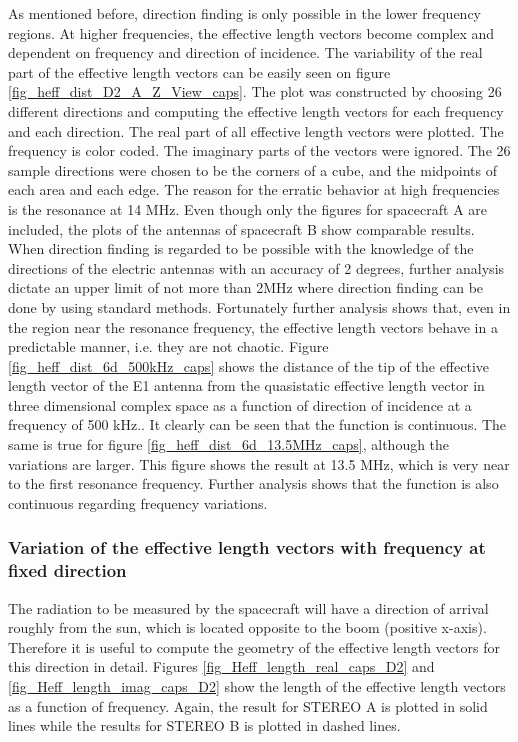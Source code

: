 \documentclass[galley,ras]{agu2001}
\begin{document}
\begin{article}
As mentioned before, direction finding is only possible in the lower frequency regions. At higher frequencies, the effective length vectors become complex and dependent on frequency and direction of incidence. The variability of the real part of the effective length vectors can be easily seen on figure \ref{fig_heff_dist_D2_A_Z_View_caps}. The plot was constructed by choosing 26 different directions and computing the effective length vectors for each frequency and each direction. The real part of all effective length vectors were plotted. The frequency is color coded. The imaginary parts of the vectors were ignored. The 26 sample directions were chosen to be the corners of a cube, and the midpoints of each area and each edge. The reason for the erratic behavior at high frequencies is the resonance at 14 MHz. Even though only the figures for spacecraft A are included, the plots of the antennas of spacecraft B show comparable results.\\


When direction finding is regarded to be possible with the knowledge of the directions of the electric antennas with an accuracy of 2 degrees, further analysis dictate an upper limit of not more than 2MHz where direction finding can be done by using standard methods. Fortunately further analysis shows that, even in the region near the resonance frequency, the effective length vectors behave in a predictable manner, i.e. they are not chaotic. Figure \ref{fig_heff_dist_6d_500kHz_caps} shows the distance of the tip of the effective length vector of the E1 antenna from the quasistatic effective length vector in three dimensional complex space as a function of direction of incidence at a frequency of 500 kHz.. It clearly can be seen that the function is continuous. The same is true for figure \ref{fig_heff_dist_6d_13.5MHz_caps}, although the variations are larger. This figure shows the result at 13.5 MHz, which is very near to the first resonance frequency. Further analysis shows that the function is also continuous regarding frequency variations.\\


\subsubsection{Variation of the effective length vectors with frequency at fixed direction}
The radiation to be measured by the spacecraft will have a direction of arrival roughly from the sun, which is located opposite to the boom (positive x-axis). Therefore it is useful to compute the geometry of the effective length vectors for this direction in detail. Figures \ref{fig_Heff_length_real_caps_D2} and \ref{fig_Heff_length_imag_caps_D2} show the length of the effective length vectors as a function of frequency. Again, the result for STEREO A is plotted in solid lines while the results for STEREO B is plotted in dashed lines.\\


\end{article}
\end{document}
